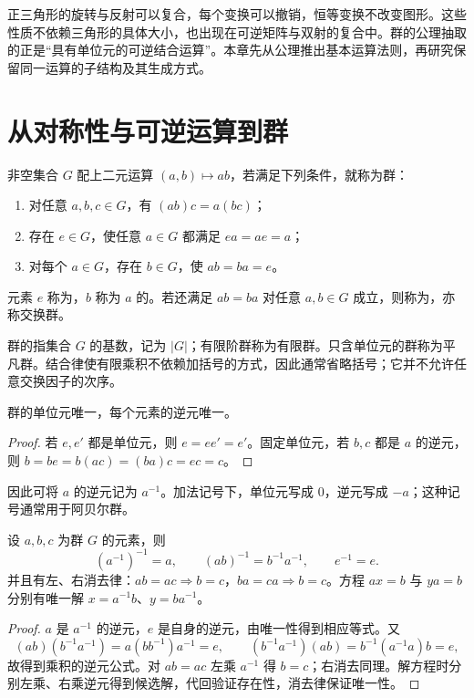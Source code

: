 \documentclass[UTF8,12pt,a4paper,fontset=fandol]{ctexbook}
\begin{document}
正三角形的旋转与反射可以复合，每个变换可以撤销，恒等变换不改变图形。这些性质不依赖三角形的具体大小，也出现在可逆矩阵与双射的复合中。群的公理抽取的正是“具有单位元的可逆结合运算”。本章先从公理推出基本运算法则，再研究保留同一运算的子结构及其生成方式。

\section{从对称性与可逆运算到群}\label{sec:group-axioms}

\begin{definition}[群]
非空集合 $G$ 配上二元运算 $(a,b)\mapsto ab$，若满足下列条件，就称为群：
\begin{enumerate}
  \item 对任意 $a,b,c\in G$，有 $(ab)c=a(bc)$；
  \item 存在 $e\in G$，使任意 $a\in G$ 都满足 $ea=ae=a$；
  \item 对每个 $a\in G$，存在 $b\in G$，使 $ab=ba=e$。
\end{enumerate}
元素 $e$ 称为，$b$ 称为 $a$ 的。若还满足 $ab=ba$ 对任意 $a,b\in G$ 成立，则称为，亦称交换群。
\end{definition}

群的指集合 $G$ 的基数，记为 $|G|$；有限阶群称为有限群。只含单位元的群称为平凡群。结合律使有限乘积不依赖加括号的方式，因此通常省略括号；它并不允许任意交换因子的次序。

\begin{proposition}[单位元与逆元的唯一性]\label{prop:group-uniqueness}
群的单位元唯一，每个元素的逆元唯一。
\end{proposition}
\begin{proof}
若 $e,e'$ 都是单位元，则 $e=ee'=e'$。固定单位元，若 $b,c$ 都是 $a$ 的逆元，则 $b=be=b(ac)=(ba)c=ec=c$。
\end{proof}

因此可将 $a$ 的逆元记为 $a^{-1}$。加法记号下，单位元写成 $0$，逆元写成 $-a$；这种记号通常用于阿贝尔群。

\begin{proposition}[基本运算法则]\label{prop:group-calculation}
设 $a,b,c$ 为群 $G$ 的元素，则
\[
  (a^{-1})^{-1}=a,\qquad (ab)^{-1}=b^{-1}a^{-1},\qquad e^{-1}=e.
\]
并且有左、右消去律：$ab=ac\Rightarrow b=c$，$ba=ca\Rightarrow b=c$。方程 $ax=b$ 与 $ya=b$ 分别有唯一解 $x=a^{-1}b$、$y=ba^{-1}$。
\end{proposition}
\begin{proof}
$a$ 是 $a^{-1}$ 的逆元，$e$ 是自身的逆元，由唯一性得到相应等式。又
\[
  (ab)(b^{-1}a^{-1})=a(bb^{-1})a^{-1}=e,\qquad
  (b^{-1}a^{-1})(ab)=b^{-1}(a^{-1}a)b=e,
\]
故得到乘积的逆元公式。对 $ab=ac$ 左乘 $a^{-1}$ 得 $b=c$；右消去同理。解方程时分别左乘、右乘逆元得到候选解，代回验证存在性，消去律保证唯一性。
\end{proof}
\end{document}
